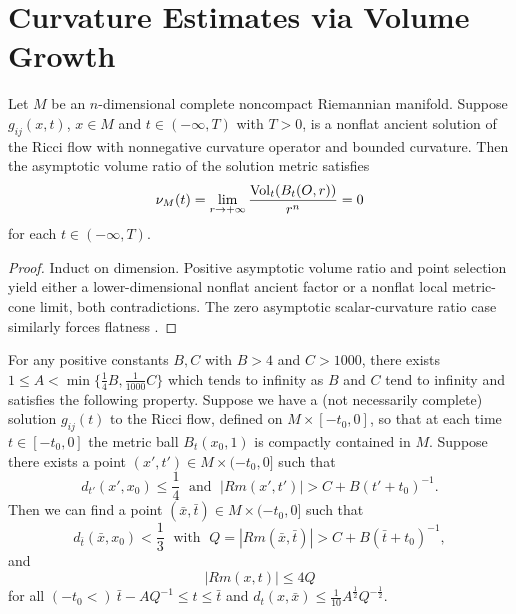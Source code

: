 \section{Curvature Estimates via Volume Growth}
\begin{lemma} 
  \label{lem:cz-ancient-solution-asymptotic-volume-ratio-zero}

Let $M$ be an $n$-dimensional complete noncompact Riemannian
manifold. Suppose $g_{ij}(x,t)$, $x\in M$ and $t\in(-\infty,T)$
with $T>0$, is a nonflat ancient solution of the Ricci flow with
nonnegative curvature operator and bounded curvature. Then the
asymptotic volume ratio of the solution metric satisfies
$$
\nu_M(t)=\lim_{r\rightarrow+\infty}\frac{\operatorname{Vol}_t(B_t(O,r))}{r^n}=0
$$
for each $t\in(-\infty,T)$.
\end{lemma}
\begin{proof}
\sketch Induct on dimension.  Positive asymptotic volume ratio and
point selection yield either a lower-dimensional nonflat ancient factor
or a nonflat local metric-cone limit, both contradictions.  The zero
asymptotic scalar-curvature ratio case similarly forces flatness
\cite{P1}.
\end{proof}
\begin{lemma}
  \label{lem:cz-parabolic-point-picking-curvature-control}

For any positive constants $B, C$ with $B>4$ and $C>1000$, there
exists $1\leq A<\min\{\frac{1}{4}B,\frac{1}{1000}C\}$ which tends
to infinity as $B$ and $C$ tend to infinity and satisfies the
following property. Suppose we have a (not necessarily complete)
solution $g_{ij}(t)$ to the Ricci flow, defined on $M\times
[-t_0,0]$, so that at each time $t\in [-t_0,0]$ the metric ball
$B_t(x_0,1)$ is compactly contained in $M$. Suppose there exists a
point $(x',t') \in M\times (-t_0,0]$ such that
$$
d_{t'}(x',x_0)\leq \frac{1}{4} \; \mbox{ and }\;
|Rm(x',t')|>C+B(t'+t_0)^{-1}.
$$
Then we can find a point $(\bar{x},\bar{t}) \in M\times (-t_0,0]$
such that
$$
d_{\bar{t}}(\bar{x},x_0)<\frac{1}{3}\; \mbox{ with }\; Q
=|Rm(\bar{x},\bar{t})|>C+ B(\bar{t}+t_0)^{-1},
$$
and
$$
|Rm(x,t)|\leq 4Q
$$
for all $(-t_0<) \ \bar{t}-AQ^{-1}\leq t\leq \bar{t}$ and
$d_t(x,\bar{x})\leq \frac{1}{10}A^{\frac{1}{2}}Q^{-\frac{1}{2}}.$
\end{lemma}
